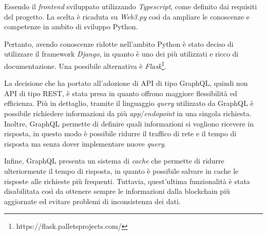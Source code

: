 Essendo il \textit{frontend} sviluppato utilizzando \textit{Typescript}, come definito dai requisiti del progetto. La scelta è ricaduta su \textit{Web3.py} così da ampliare le conoscenze e competenze in ambito di sviluppo Python. 

Pertanto, avendo conoscenze ridotte nell'ambito Python è stato deciso di utilizzare il framework \textit{Django}, in quanto è uno dei più utilizzati e ricco di documentazione. Una possibile alternativa è \textit{Flask}\footnote{https://flask.palletsprojects.com/}.

La decisione che ha portato all'adozione di API di tipo GraphQL, quindi non API di tipo REST, è stata presa in quanto offrono maggiore flessibilità ed efficienza. Più in dettaglio, tramite il linguaggio \textit{query} utilizzato da GraphQL è possibile richiedere informazioni da più \textit{app}/\textit{endopoint} in una singola richiesta. Inoltre, GraphQL permette di definire quali informazioni si vogliono ricevere in risposta, in questo modo è possibile ridurre il traffico di rete e il tempo di risposta ma senza dover implementare nuove \textit{query}.

Infine, GraphQL presenta un sistema di \textit{cache} che permette di ridurre ulteriormente il tempo di risposta, in quanto è possibile salvare in cache le risposte alle richieste più frequenti. Tuttavia, quest'ultima funzionalità è stata disabilitata così da ottenere sempre le informazioni dalla blockchain più aggiornate ed evitare problemi di inconsistenza dei dati.
